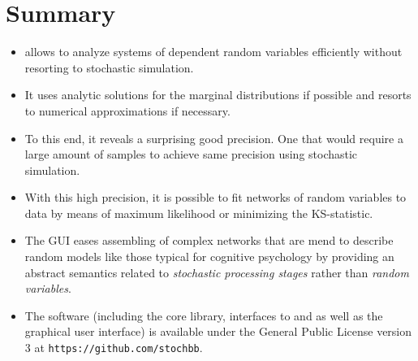 \section{Summary}
\begin{itemize}
 \item {} allows to analyze systems of dependent random variables efficiently without resorting to stochastic simulation.
 \item It uses analytic solutions for the marginal distributions if possible and resorts to numerical approximations if necessary.
 \item To this end, it reveals a surprising good precision. One that would require a large amount of samples to achieve same precision using stochastic simulation.
 \item With this high precision, it is possible to fit networks of random variables to data by means of maximum likelihood or minimizing the KS-statistic.
 \item The GUI eases assembling of complex networks that are mend to describe random models like those typical for cognitive psychology by providing an abstract semantics related to \emph{stochastic processing stages} rather than \emph{random variables}.
 \item The software (including the core library, interfaces to  and  as well as the graphical user interface) is available under the General Public License version 3 at \texttt{https://github.com/stochbb}. 
\end{itemize}